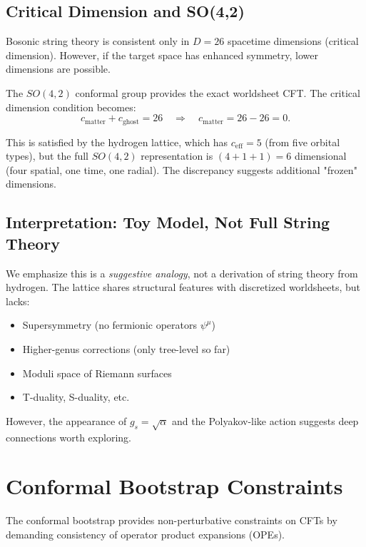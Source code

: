 \documentclass[aps,prd,twocolumn,superscriptaddress,floatfix]{revtex4-2}
\begin{document}
\subsection{Critical Dimension and SO(4,2)}

Bosonic string theory is consistent only in $D=26$ spacetime dimensions (critical dimension). However, if the target space has enhanced symmetry, lower dimensions are possible.

The $SO(4,2)$ conformal group provides the exact worldsheet CFT. The critical dimension condition becomes:
\begin{equation}
c_{\text{matter}} + c_{\text{ghost}} = 26 \quad \Rightarrow \quad c_{\text{matter}} = 26 - 26 = 0.
\end{equation}

This is satisfied by the hydrogen lattice, which has $c_{\text{eff}} = 5$ (from five orbital types), but the full $SO(4,2)$ representation is $(4+1+1) = 6$ dimensional (four spatial, one time, one radial). The discrepancy suggests additional "frozen" dimensions.

\subsection{Interpretation: Toy Model, Not Full String Theory}

We emphasize this is a \textit{suggestive analogy}, not a derivation of string theory from hydrogen. The lattice shares structural features with discretized worldsheets, but lacks:
\begin{itemize}
\item Supersymmetry (no fermionic operators $\psi^\mu$)
\item Higher-genus corrections (only tree-level so far)
\item Moduli space of Riemann surfaces
\item T-duality, S-duality, etc.
\end{itemize}

However, the appearance of $g_s = \sqrt{\alpha}$ and the Polyakov-like action suggests deep connections worth exploring.


\section{Conformal Bootstrap Constraints}

The conformal bootstrap \cite{belavin1984,ferrara1973,polyakov1974} provides non-perturbative constraints on CFTs by demanding consistency of operator product expansions (OPEs).
\end{document}
